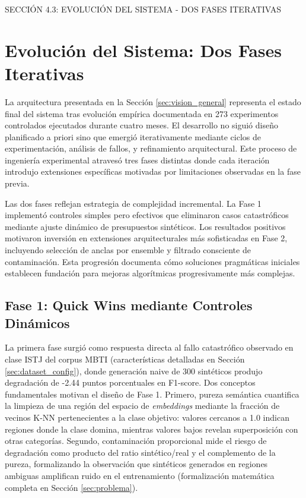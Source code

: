 SECCIÓN 4.3: EVOLUCIÓN DEL SISTEMA - DOS FASES ITERATIVAS

\section{Evolución del Sistema: Dos Fases Iterativas}
\label{sec:evolucion_fases}

La arquitectura presentada en la Sección \ref{sec:vision_general} representa el estado final del sistema tras evolución empírica documentada en 273 experimentos controlados ejecutados durante cuatro meses. El desarrollo no siguió diseño planificado a priori sino que emergió iterativamente mediante ciclos de experimentación, análisis de fallos, y refinamiento arquitectural. Este proceso de ingeniería experimental atravesó tres fases distintas donde cada iteración introdujo extensiones específicas motivadas por limitaciones observadas en la fase previa.

Las dos fases reflejan estrategia de complejidad incremental. La Fase 1 implementó controles simples pero efectivos que eliminaron casos catastróficos mediante ajuste dinámico de presupuestos sintéticos. Los resultados positivos motivaron inversión en extensiones arquitecturales más sofisticadas en Fase 2, incluyendo selección de anclas por ensemble y filtrado consciente de contaminación. Esta progresión documenta cómo soluciones pragmáticas iniciales establecen fundación para mejoras algorítmicas progresivamente más complejas.

\subsection{Fase 1: Quick Wins mediante Controles Dinámicos}
\label{subsec:fase1}

La primera fase surgió como respuesta directa al fallo catastrófico observado en clase ISTJ del corpus MBTI (características detalladas en Sección \ref{sec:dataset_config}), donde generación naive de 300 sintéticos produjo degradación de -2.44 puntos porcentuales en F1-score. Dos conceptos fundamentales motivan el diseño de Fase 1. Primero, pureza semántica cuantifica la limpieza de una región del espacio de \textit{embeddings} mediante la fracción de vecinos K-NN pertenecientes a la clase objetivo: valores cercanos a 1.0 indican regiones donde la clase domina, mientras valores bajos revelan superposición con otras categorías. Segundo, contaminación proporcional mide el riesgo de degradación como producto del ratio sintético/real y el complemento de la pureza, formalizando la observación que sintéticos generados en regiones ambiguas amplifican ruido en el entrenamiento (formalización matemática completa en Sección \ref{sec:problema}).

